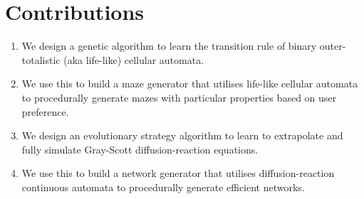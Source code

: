 \section{Contributions}

\begin{enumerate}
    \item We design a genetic algorithm to learn the transition rule of binary outer-totalistic (aka life-like) cellular automata.
    \item We use this to build a maze generator that utilises life-like cellular automata to procedurally generate mazes with particular properties based on user preference.
    \item We design an evolutionary strategy algorithm to learn to extrapolate and fully simulate Gray-Scott diffusion-reaction equations.
    \item We use this to build a network generator that utilises diffusion-reaction continuous automata to procedurally generate efficient networks.
\end{enumerate}
